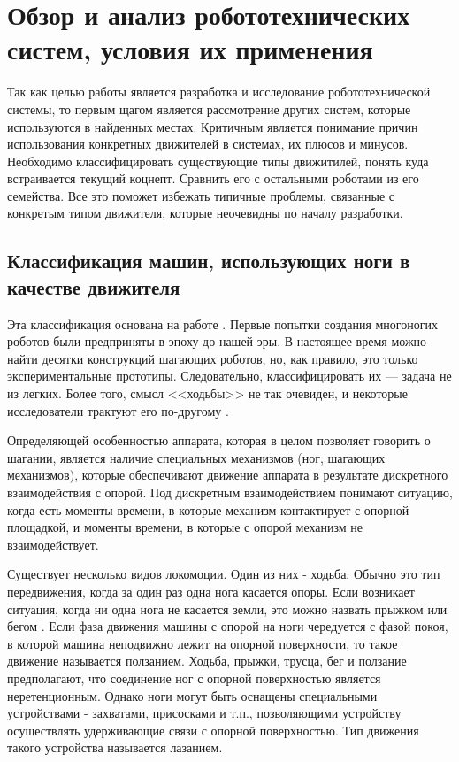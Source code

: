 \chapter{Обзор и анализ робототехнических систем, условия их применения}\label{ch:ch1}
Так как целью работы является разработка и исследование робототехнической системы, то первым щагом является рассмотрение других систем, которые используются в найденных местах. Критичным является понимание причин использования конкретных движителей в системах, их плюсов и минусов. Необходимо классифицировать существующие типы движитилей, понять куда встраивается текущий коцнепт. Сравнить его с остальными роботами из его семейства. Все это поможет избежать типичные проблемы, связанные с конкретым типом движителя, которые неочевидны по началу разработки.

\section{Классификация машин, использующих ноги в качестве движителя}
Эта классификация основана на работе \cite{Maloletov2015dinamica}. Первые попытки создания многоногих роботов были предприняты в эпоху до нашей эры. В настоящее время можно найти десятки конструкций шагающих роботов, но, как правило, это только экспериментальные прототипы. Следовательно, классифицировать их --- задача не из легких. Более того, смысл <<ходьбы>> не так очевиден, и некоторые исследователи трактуют его по-другому \cite{Bel1984,Brisk2009,Ohom1984,Pavl2013}. 

Определяющей особенностью аппарата, которая в целом позволяет говорить о шагании, является наличие специальных механизмов (ног, шагающих механизмов), которые обеспечивают движение аппарата в результате дискретного взаимодействия с опорой. Под дискретным взаимодействием понимают ситуацию, когда есть моменты времени, в которые механизм контактирует с опорной площадкой, и моменты времени, в которые с опорой механизм не взаимодействует.

Существует несколько видов локомоции. Один из них - ходьба. Обычно это тип передвижения, когда за один раз одна нога касается опоры. Если возникает ситуация, когда ни одна нога не касается земли, это можно назвать прыжком или бегом \cite{Ohom1984}. Если фаза движения машины с опорой на ноги чередуется с фазой покоя, в которой машина неподвижно лежит на опорной поверхности, то такое движение называется ползанием. Ходьба, прыжки, трусца, бег и ползание предполагают, что соединение ног с опорной поверхностью является неретенционным. Однако ноги могут быть оснащены специальными устройствами - захватами, присосками и т.п., позволяющими устройству осуществлять удерживающие связи с опорной поверхностью. Тип движения такого устройства называется лазанием.

